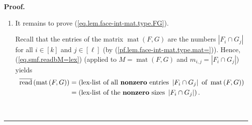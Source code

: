 \documentclass[12pt]{article}
\theoremstyle{definition}%
\theoremstyle{definition}%
\theoremstyle{remark}%
\newcommand{\interval}[1]{\left[ #1 \right]} %
\newcommand{\readb}{\mathop{\overline{\operatorname{read}}}}
\newcommand{\mat}{\operatorname{mat}}
\newenvironment{proof}[1][Proof]{\noindent\textbf{#1.} }{\ \rule{0.5em}{0.5em}}
\begin{document}
\begin{proof}
\begin{enumerate}
\item It remains to prove (\ref{eq.lem.face-int-mat.type.FG}).

Recall that the entries of the matrix $\mat\left(  F,G\right)
$ are the numbers $\left\vert F_{i}\cap G_{j}\right\vert $ for all
$i\in\interval{k}  $ and $j\in\interval{\ell}$ (by
(\ref{pf.lem.face-int-mat.type.mat=})). Hence, (\ref{eq.smf.readbM=lex})
(applied to $M=\mat\left(  F,G\right)  $ and $m_{i,j}
=\left\vert F_{i}\cap G_{j}\right\vert $) yields
\begin{align}
\readb \left(  \mat\left(  F,G\right)
\right)   &  =\left(  \text{lex-list of all \textbf{nonzero} entries
}\left\vert F_{i}\cap G_{j}\right\vert \text{ of }\mat\left(
F,G\right)  \right) \nonumber\\
&  =\left(  \text{lex-list of the \textbf{nonzero} sizes }\left\vert F_{i}\cap
G_{j}\right\vert \right)  .
\label{pf.lem.face-int-mat.type.readmat}
\end{align}



\end{enumerate}
\end{proof}
\end{document}

